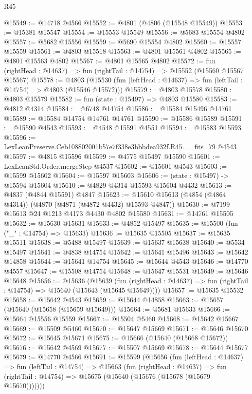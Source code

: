 \begin{lexlean}{R45}
\begin{coremodule}
@15549 := @14718 @4566
@15552 := @4801 (@4806 (@15548 @15549))
@15553 := @15381 @15547
@15554 := @15553 @15549
@15556 := @5683 @15554 @4802
@15557 := @5682 @15556
@15559 := @5690 @15554 @4802
@15560 := @15557 @15559
@15561 := @4803 @15518
@15563 := @4801 @15561 @4802
@15565 := @4801 @15563 @4802
@15567 := @4801 @15565 @4802
@15572 := fun (rightHead : @14637) => fun (rightTail : @14754) => @15552 (@15560 @15567 @15567)
@15578 := @4803
    (@15530 (fun (leftHead : @14637) => fun (leftTail : @14754) => @4803 (@15546 @15572)))
@15579 := @4803 @15578
@15580 := @4803 @15579
@15582 := fun (state : @15497) => @4803 @15580
@15583 := @4812 @4314
@15584 := @6748 @14754
@15586 := @15584 @15496 @14761
@15589 := @15584 @14754 @14761 @14761
@15590 := @15586 @15589
@15591 := @15590 @4543
@15593 := @4548 @15591 @4551
@15594 := @15583 @15593
@15596 := LexLeanPreserve.Ceb108802001b57e7f338e3bbbdea932f.R45.__fits_79 @4543
@15597 := @4815 @15596
@15599 := @4775 @15497 @15590
@15601 := LexLeanStd.Order.mergeStep @4537
@15602 := @15601 @4543
@15603 := @15599 @15602
@15604 := @15597 @15603
@15606 := (state : @15497) -> @15594 @15604
@15610 := @4829 @4314 @15593 @15604 @4432
@15613 := @4837 (@4844 @15591) @4847
@15623 := @15610 @15613 (@4854 (@4864 @4314)) (@4870 (@4871 (@4872 @4432) @15593 @4847))
@15630 := @7199 @15613 @24 @1213 @4173 @4430 @4802 @15580
@15631 := @14761 @15505
@15632 := @15630 @15631
@15633 := @4852 @15497
@15635 := @15500 (fun ("_" : @14754) => @15633)
@15636 := @15635 @15505
@15637 := @15635 @15511
@15638 := @5488 @15497
@15639 := @15637 @15638
@15640 := @5534 @15497
@15641 := @4838 @14754
@15642 := @15641 @15496
@15643 := @15642 @14858
@15644 := @15641 @14754
@15645 := @15644 @4543
@15646 := @14770 @4557
@15647 := @15508 @14754
@15648 := @15647 @15531
@15649 := @15646 @15648
@15656 := @15636
    (@15639
      (fun (rightHead : @14637) => fun (rightTail : @14754) => @15640 (@15643 (@15645 @15649))))
@15657 := @15635 @15532
@15658 := @15642 @4543
@15659 := @15644 @14858
@15663 := @15657 (@15640 (@15658 (@15659 @15649)))
@15664 := @5681 @15633
@15666 := @15664 @15556 @15559
@15667 := @15504 @5460
@15668 := @15642 @15667
@15669 := @15509 @5460
@15670 := @15647 @15669
@15671 := @15646 @15670
@15672 := @15645 @15671
@15675 := @15666 (@15640 (@15668 @15672))
@15676 := @15642 @4569
@15677 := @15507 @15669
@15678 := @15644 @15677
@15679 := @14770 @4566
@15691 := @15599
    (@15656
      (fun (leftHead : @14637) =>
      fun (leftTail : @14754) =>
      @15663
        (fun (rightHead : @14637) =>
        fun (rightTail : @14754) => @15675 (@15640 (@15676 (@15678 (@15679 @15670)))))))

\end{coremodule}
\end{lexlean}
